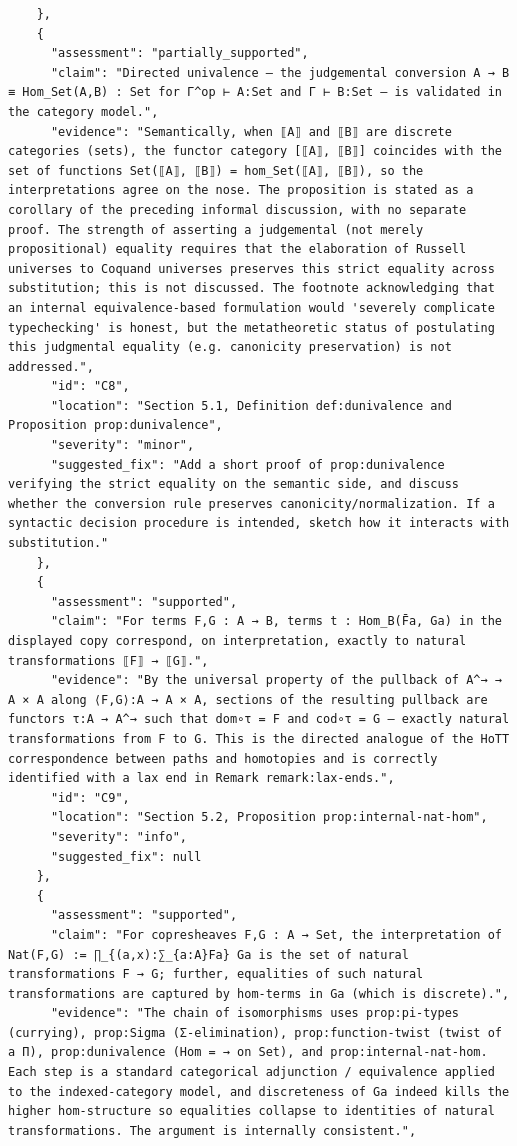 \documentclass[11pt]{article}
\begin{document}
\begin{verbatim}
    },
    {
      "assessment": "partially_supported",
      "claim": "Directed univalence — the judgemental conversion A → B ≡ Hom_Set(A,B) : Set for Γ^op ⊢ A:Set and Γ ⊢ B:Set — is validated in the category model.",
      "evidence": "Semantically, when ⟦A⟧ and ⟦B⟧ are discrete categories (sets), the functor category [⟦A⟧, ⟦B⟧] coincides with the set of functions Set(⟦A⟧, ⟦B⟧) = hom_Set(⟦A⟧, ⟦B⟧), so the interpretations agree on the nose. The proposition is stated as a corollary of the preceding informal discussion, with no separate proof. The strength of asserting a judgemental (not merely propositional) equality requires that the elaboration of Russell universes to Coquand universes preserves this strict equality across substitution; this is not discussed. The footnote acknowledging that an internal equivalence-based formulation would 'severely complicate typechecking' is honest, but the metatheoretic status of postulating this judgmental equality (e.g. canonicity preservation) is not addressed.",
      "id": "C8",
      "location": "Section 5.1, Definition def:dunivalence and Proposition prop:dunivalence",
      "severity": "minor",
      "suggested_fix": "Add a short proof of prop:dunivalence verifying the strict equality on the semantic side, and discuss whether the conversion rule preserves canonicity/normalization. If a syntactic decision procedure is intended, sketch how it interacts with substitution."
    },
    {
      "assessment": "supported",
      "claim": "For terms F,G : A → B, terms t : Hom_B(F̄a, Ga) in the displayed copy correspond, on interpretation, exactly to natural transformations ⟦F⟧ → ⟦G⟧.",
      "evidence": "By the universal property of the pullback of A^→ → A × A along ⟨F,G⟩:A → A × A, sections of the resulting pullback are functors τ:A → A^→ such that dom∘τ = F and cod∘τ = G — exactly natural transformations from F to G. This is the directed analogue of the HoTT correspondence between paths and homotopies and is correctly identified with a lax end in Remark remark:lax-ends.",
      "id": "C9",
      "location": "Section 5.2, Proposition prop:internal-nat-hom",
      "severity": "info",
      "suggested_fix": null
    },
    {
      "assessment": "supported",
      "claim": "For copresheaves F,G : A → Set, the interpretation of Nat(F,G) := ∏_{(a,x):∑_{a:A}Fa} Ga is the set of natural transformations F → G; further, equalities of such natural transformations are captured by hom-terms in Ga (which is discrete).",
      "evidence": "The chain of isomorphisms uses prop:pi-types (currying), prop:Sigma (Σ-elimination), prop:function-twist (twist of a Π), prop:dunivalence (Hom = → on Set), and prop:internal-nat-hom. Each step is a standard categorical adjunction / equivalence applied to the indexed-category model, and discreteness of Ga indeed kills the higher hom-structure so equalities collapse to identities of natural transformations. The argument is internally consistent.",

\end{verbatim}
\end{document}
